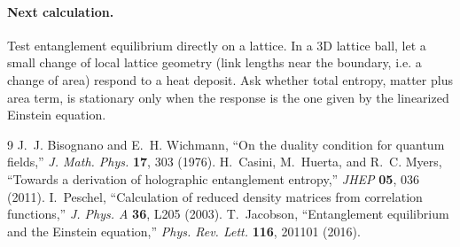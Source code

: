 \documentclass[11pt]{article}
\begin{document}
\paragraph{Next calculation.} Test entanglement equilibrium directly on a lattice. In a 3D lattice ball, let a small change of local lattice geometry (link lengths near the boundary, i.e. a change of area) respond to a heat deposit. Ask whether total entropy, matter plus area term, is stationary only when the response is the one given by the linearized Einstein equation.

\begin{thebibliography}{9}
 J.~J. Bisognano and E.~H. Wichmann, ``On the duality condition for quantum fields,'' \emph{J. Math. Phys.} \textbf{17}, 303 (1976).
 H.~Casini, M.~Huerta, and R.~C. Myers, ``Towards a derivation of holographic entanglement entropy,'' \emph{JHEP} \textbf{05}, 036 (2011).
 I.~Peschel, ``Calculation of reduced density matrices from correlation functions,'' \emph{J. Phys. A} \textbf{36}, L205 (2003).
 T.~Jacobson, ``Entanglement equilibrium and the Einstein equation,'' \emph{Phys. Rev. Lett.} \textbf{116}, 201101 (2016).
\end{thebibliography}
\end{document}
